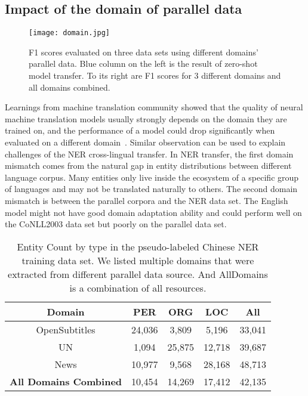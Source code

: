 \documentclass[11pt]{article}
\begin{document}
\subsection{Impact of the domain of parallel data}

\begin{figure}[!h]
	\centering
	\texttt{[image: domain.jpg]}
	\caption{F1 scores evaluated on three data sets using different domains' parallel data. Blue column on the left is the result of zero-shot model transfer. To its right are F1 scores for 3 different domains and all domains combined.}
	\label{fig:domain}
\end{figure}

Learnings from machine translation community showed that the quality of neural machine translation models usually strongly depends on the domain they are trained on, and the performance of a model could drop significantly when evaluated on a different domain~\cite{koehn-knowles-2017-six}. Similar observation can be used to explain challenges of the NER cross-lingual transfer. In NER transfer, the first domain mismatch comes from the natural gap in entity distributions between different language corpus. Many entities only live inside the ecosystem of a specific group of languages and may not be translated naturally to others. The second domain mismatch is between the parallel corpora and the NER data set. The English model might not have good domain adaptation ability and could perform well on the CoNLL2003 data set but poorly on the parallel data set.

\begin{table}[h]
	\scriptsize
	\begin{center}
		\begin{tabular}{c|c|c|c|c}
			\toprule
			\textbf{Domain} & \textbf{PER} & \textbf{ORG} & \textbf{LOC} & \textbf{All}\\
			\hline
			OpenSubtitles & 24,036 & 3,809 & 5,196 & 33,041   \\
			\hline
			UN	& 1,094 & 25,875 & 12,718 & 39,687  \\
			\hline
			News & 10,977 & 9,568 & 28,168 & 48,713 \\
			\hline
			\textbf{All Domains Combined}	& 10,454 & 14,269 & 17,412 & 42,135 \\
			\toprule
		\end{tabular}
	\end{center}
	\caption{Entity Count by type in the pseudo-labeled Chinese NER training data set. We listed multiple domains that were extracted from different parallel data source. And AllDomains is a combination of all resources.}
	\label{tab:typedistribution}
\end{table}
\end{document}
